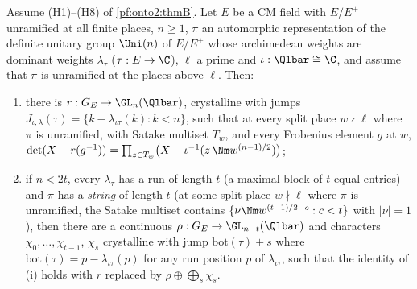 \begin{proposition}\label{pf:onto2:galrep}
Assume (H1)--(H8) of \cref{pf:onto2:thmB}. Let $E$ be a CM field with $E/E^+$ unramified at all finite places, $n\ge1$, $\pi$ an
automorphic representation of the definite unitary group $\Uni(n)$ of $E/E^+$ whose archimedean weights are dominant weights
$\lambda_\tau$ ($\tau:E\to\C$), $\ell$ a prime and $\iota:\Qlbar\cong\C$, and assume that $\pi$ is unramified at the places above $\ell$.
Then:
\begin{enumerate}[label=(\roman*)]
\item there is $r:G_E\to\GL_n(\Qlbar)$, crystalline with jumps $J_{\iota,\lambda}(\tau)=\{k-\lambda_{\iota\tau}(k):k<n\}$, such that at every
  split place $w\nmid\ell$ where $\pi$ is unramified, with Satake multiset $T_w$, and every Frobenius element $g$ at $w$,
  $\det(X-r(g^{-1}))=\prod_{z\in T_w}\bigl(X-\iota^{-1}(z\,\Nm w^{(n-1)/2})\bigr)$;
\item if $n<2t$, every $\lambda_\tau$ has a run of length $t$ (a maximal block of $t$ equal entries) and $\pi$ has a \emph{string} of
  length $t$ (at some split place $w\nmid\ell$ where $\pi$ is unramified, the Satake multiset contains $\{\nu\Nm w^{(t-1)/2-c}:c<t\}$
  with $|\nu|=1$), then there are a continuous $\rho:G_E\to\GL_{n-t}(\Qlbar)$ and characters $\chi_0,\dots,\chi_{t-1}$, $\chi_s$ crystalline
  with jump $\mathrm{bot}(\tau)+s$ where $\mathrm{bot}(\tau)=p-\lambda_{\iota\tau}(p)$ for any run position $p$ of $\lambda_{\iota\tau}$, such
  that the identity of (i) holds with $r$ replaced by $\rho\oplus\bigoplus_s\chi_s$.
\end{enumerate}
\end{proposition}

